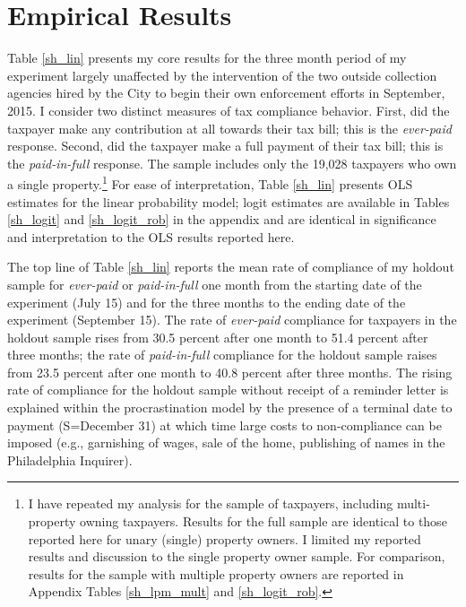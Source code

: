 \section{Empirical Results}

Table \ref{sh_lin} presents my core results for the three month
period of my experiment largely unaffected by the intervention of the
two outside collection agencies hired by the City to begin their own
enforcement efforts in September, 2015. I consider two distinct
measures of tax compliance behavior. First, did the taxpayer make any
contribution at all towards their tax bill; this is the
\textit{ever-paid} response. Second, did the taxpayer make a full
payment of their tax bill; this is the \textit{paid-in-full}
response. The sample includes only the 19,028 taxpayers who own a
single property.\footnote{I have repeated my analysis for the sample
  of taxpayers, including multi-property owning taxpayers. Results
  for the full sample are identical to those reported here for unary
  (single) property owners. I limited my reported results and
  discussion to the single property owner sample. For comparison,
  results for the sample with multiple property owners are reported in
  Appendix Tables \ref{sh_lpm_mult} and \ref{sh_logit_rob}.} For ease
of interpretation, Table \ref{sh_lin} presents OLS estimates for the
linear probability model; logit estimates are available in Tables
\ref{sh_logit} and \ref{sh_logit_rob} in the appendix and are
identical in significance and interpretation to the OLS results
reported here.

The top line of Table \ref{sh_lin} reports the mean rate of compliance
of my holdout sample for \textit{ever-paid} or \textit{paid-in-full}
one month from the starting date of the experiment (July 15) and for
the three months to the ending date of the experiment (September
15). The rate of \textit{ever-paid} compliance for taxpayers in the
holdout sample rises from 30.5 percent after one month to 51.4 percent
after three months; the rate of \textit{paid-in-full} compliance for
the holdout sample raises from 23.5 percent after one month to 40.8
percent after three months. The rising rate of compliance for the
holdout sample without receipt of a reminder letter is explained
within the \cite{DR-99} procrastination model by the presence of a
terminal date to payment (S=December 31) at which time large costs to
non-compliance can be imposed (e.g., garnishing of wages, sale of the
home, publishing of names in the Philadelphia Inquirer).

